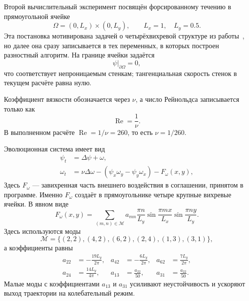 \documentclass[12pt,a4paper]{article}
\newcommand{\Reynolds}{\operatorname{Re}}
\newcommand{\Laplace}{\Delta}
\begin{document}
Второй вычислительный эксперимент посвящён форсированному течению в прямоугольной ячейке
\begin{equation}
    \Omega=(0,L_x)\times(0,L_y),
    \qquad
    L_x=1,\quad L_y=0.5.
    \label{eq:kornev-domain}
\end{equation}
Эта постановка мотивирована задачей о четырёхвихревой структуре из работы~\cite{kornev2018}, но далее она сразу записывается в тех переменных, в которых построен разностный алгоритм.
На границе ячейки задаётся
\begin{equation}
    \psi\big|_{\partial\Omega}=0,
    \label{eq:kornev-psi-wall}
\end{equation}
что соответствует непроницаемым стенкам; тангенциальная скорость стенок в текущем расчёте равна нулю.

Коэффициент вязкости обозначается через \(\nu\), а число Рейнольдса записывается только как
\begin{equation}
    \Reynolds=\frac{1}{\nu}.
    \label{eq:kornev-re-nu}
\end{equation}
В выполненном расчёте \(\Reynolds=1/\nu=260\), то есть \(\nu=1/260\).

Эволюционная система имеет вид
\begin{equation}
\begin{aligned}
    \psi_t
    &=
    \Laplace\psi+\omega,\\
    \omega_t
    &=
    \nu\Laplace\omega
    -
    \left(\psi_x\omega_y-\psi_y\omega_x\right)
    -
    F_\omega(x,y),
\end{aligned}
\label{eq:kornev-pseudo-system}
\end{equation}
Здесь \(F_\omega\) --- завихренная часть внешнего воздействия в соглашении, принятом в программе.
Именно \(F_\omega\) создаёт в прямоугольнике четыре крупные вихревые ячейки.
В явном виде
\begin{equation}
    F_\omega(x,y)
    =
    \sum_{(m,n)\in\mathcal M}
    a_{mn}\frac{\pi n}{L_y}
    \sin\frac{\pi m x}{L_x}
    \sin\frac{\pi n y}{L_y}.
    \label{eq:omega-forcing}
\end{equation}
Здесь используются моды
\[
    \mathcal M=\{(2,2),(4,2),(6,2),(2,4),(1,3),(3,1)\},
\]
а коэффициенты равны
\begin{equation}
\begin{aligned}
    a_{22}&=-\frac{19L_y}{2\pi},&
    a_{42}&=-\frac{6L_y}{2\pi},&
    a_{62}&=\frac{7L_y}{2\pi},\\
    a_{24}&=\frac{14L_y}{4\pi},&
    a_{13}&=\frac{a_{22}}{50},&
    a_{31}&=\frac{a_{22}}{50}.
\end{aligned}
\label{eq:force-coefficients}
\end{equation}
Малые моды с коэффициентами \(a_{13}\) и \(a_{31}\) усиливают неустойчивость и ускоряют выход траектории на колебательный режим.
\end{document}
